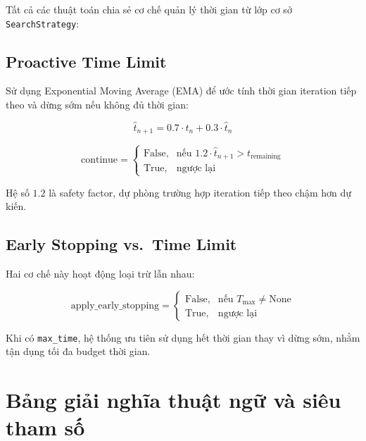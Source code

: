 \documentclass[12pt,a4paper]{article}
\begin{document}
Tất cả các thuật toán chia sẻ cơ chế quản lý thời gian từ lớp cơ sở
\texttt{SearchStrategy}:

\subsection{Proactive Time Limit}

Sử dụng Exponential Moving Average (EMA) để ước tính thời gian iteration tiếp
theo và dừng sớm nếu không đủ thời gian:

\begin{equation}
    \hat{t}_{n+1} = 0.7 \cdot t_n + 0.3 \cdot \hat{t}_n
    \label{eq:ema_general}
\end{equation}

\begin{equation}
    \text{continue} =
    \begin{cases}
        \text{False}, & \text{nếu } 1.2 \cdot \hat{t}_{n+1} > t_{\text{remaining}} \\
        \text{True}, & \text{ngược lại}
    \end{cases}
    \label{eq:proactive_stop}
\end{equation}

\noindent Hệ số $1.2$ là safety factor, dự phòng trường hợp iteration tiếp
theo chậm hơn dự kiến.

\subsection{Early Stopping vs.\ Time Limit}

Hai cơ chế này hoạt động loại trừ lẫn nhau:

\begin{equation}
    \text{apply\_early\_stopping} =
    \begin{cases}
        \text{False}, & \text{nếu } T_{\max} \neq \text{None} \\
        \text{True}, & \text{ngược lại}
    \end{cases}
    \label{eq:early_vs_time}
\end{equation}

\noindent Khi có \texttt{max\_time}, hệ thống ưu tiên sử dụng hết thời gian
thay vì dừng sớm, nhằm tận dụng tối đa budget thời gian.

\newpage
\appendix
\section{Bảng giải nghĩa thuật ngữ và siêu tham số}
\label{sec:appendix_glossary}
\end{document}
